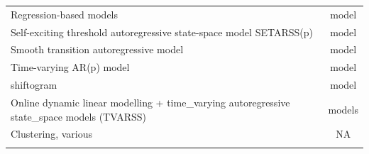 \documentclass[12pt,twoside,openany]{reedthesis}
\begin{document}
\begin{longtable}[]{@{}lc@{}}
\begin{minipage}[t]{0.31\columnwidth}
Regression-based models\strut
\end{minipage} & \begin{minipage}[t]{0.34\columnwidth}\centering\strut
model\strut
\end{minipage}\tabularnewline
\begin{minipage}[t]{0.31\columnwidth}\raggedright\strut
Self-exciting threshold autoregressive state-space model
SETARSS(p)\strut
\end{minipage} & \begin{minipage}[t]{0.34\columnwidth}\centering\strut
model\strut
\end{minipage}\tabularnewline
\begin{minipage}[t]{0.31\columnwidth}\raggedright\strut
Smooth transition autoregressive model\strut
\end{minipage} & \begin{minipage}[t]{0.34\columnwidth}\centering\strut
model\strut
\end{minipage}\tabularnewline
\begin{minipage}[t]{0.31\columnwidth}\raggedright\strut
Time-varying AR(p) model\strut
\end{minipage} & \begin{minipage}[t]{0.34\columnwidth}\centering\strut
model\strut
\end{minipage}\tabularnewline
\begin{minipage}[t]{0.31\columnwidth}\raggedright\strut
shiftogram\strut
\end{minipage} & \begin{minipage}[t]{0.34\columnwidth}\centering\strut
model\strut
\end{minipage}\tabularnewline
\begin{minipage}[t]{0.31\columnwidth}\raggedright\strut
Online dynamic linear modelling + time\_varying autoregressive
state\_space models (TVARSS)\strut
\end{minipage} & \begin{minipage}[t]{0.34\columnwidth}\centering\strut
models\strut
\end{minipage}\tabularnewline
\begin{minipage}[t]{0.31\columnwidth}\raggedright\strut
Clustering, various\strut
\end{minipage} & \begin{minipage}[t]{0.34\columnwidth}\centering\strut
NA\strut
\end{minipage}\tabularnewline
\begin{minipage}[t]{0.31\columnwidth}\raggedright\strut

\end{minipage}
\end{longtable}
\end{document}
